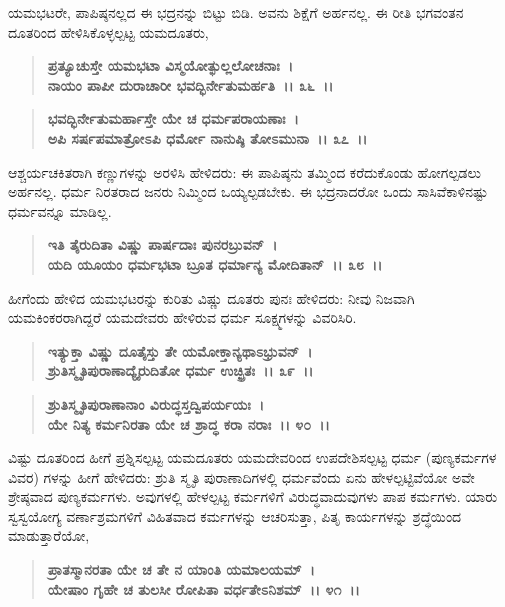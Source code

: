 ಯಮಭಟರೇ, ಪಾಪಿಷ್ಠನಲ್ಲದ ಈ ಭದ್ರನನ್ನು ಬಿಟ್ಟು ಬಿಡಿ. ಅವನು ಶಿಕ್ಷೆಗೆ ಅರ್ಹನಲ್ಲ. ಈ ರೀತಿ ಭಗವಂತನ ದೂತರಿಂದ ಹೇಳಿಸಿಕೊಳ್ಳಲ್ಪಟ್ಟ ಯಮದೂತರು,

\begin{verse}
\textbf{ಪ್ರತ್ಯೂಚುಸ್ತೇ ಯಮಭಟಾ ವಿಸ್ಮಯೋತ್ಫುಲ್ಲಲೋಚನಾಃ~।}\\\textbf{ನಾಯಂ ಪಾಪೀ ದುರಾಚಾರೀ ಭವದ್ಭಿರ್ನೇತುಮರ್ಹತಿ~।। ೩೬~।। }
\end{verse}

\begin{verse}
\textbf{ಭವದ್ಭಿರ್ನೇತುಮರ್ಹಾಸ್ತೇ ಯೇ ಚ ಧರ್ಮಪರಾಯಣಾಃ~।}\\\textbf{ಅಪಿ ಸರ್ಷಪಮಾತ್ರೋಽಪಿ ಧರ್ಮೋ ನಾನುಷ್ಠಿ ತೋಽಮುನಾ~।। ೩೭~।।}
\end{verse}

ಆಶ್ಚರ್ಯಚಕಿತರಾಗಿ ಕಣ್ಣುಗಳನ್ನು ಅರಳಿಸಿ ಹೇಳಿದರು: ಈ ಪಾಪಿಷ್ಠನು ತಮ್ಮಿಂದ ಕರೆದುಕೊಂಡು ಹೋಗಲ್ಪಡಲು ಅರ್ಹನಲ್ಲ. ಧರ್ಮ ನಿರತರಾದ ಜನರು ನಿಮ್ಮಿಂದ ಒಯ್ಯಲ್ಪಡಬೇಕು. ಈ ಭದ್ರನಾದರೋ ಒಂದು ಸಾಸಿವೆಕಾಳಿನಷ್ಟು ಧರ್ಮವನ್ನೂ ಮಾಡಿಲ್ಲ.

\begin{verse}
\textbf{ಇತಿ ತೈರುದಿತಾ ವಿಷ್ಣು ಪಾರ್ಷದಾಃ ಪುನರಬ್ರುವನ್~।}\\\textbf{ಯದಿ ಯೂಯಂ ಧರ್ಮಭಟಾ ಬ್ರೂತ ಧರ್ಮಾನ್ಯ ಮೋದಿತಾನ್~।। ೩೮~।।}
\end{verse}

ಹೀಗೆಂದು ಹೇಳಿದ ಯಮಭಟರನ್ನು ಕುರಿತು ವಿಷ್ಣು ದೂತರು ಪುನಃ ಹೇಳಿದರು: ನೀವು ನಿಜವಾಗಿ ಯಮಕಿಂಕರರಾಗಿದ್ದರೆ ಯಮದೇವರು ಹೇಳಿರುವ ಧರ್ಮ ಸೂಕ್ಷ್ಮಗಳನ್ನು ವಿವರಿಸಿರಿ.

\begin{verse}
\textbf{ಇತ್ಯುಕ್ತಾ ವಿಷ್ಣು ದೂತೈಸ್ತು ತೇ ಯಮೋಕ್ತಾನ್ಯಥಾಽಭ್ರುವನ್~।}\\\textbf{ಶ್ರುತಿಸ್ಮೃತಿಪುರಾಣಾದ್ಯೈರುದಿತೋ ಧರ್ಮ ಉಚ್ಛ್ರಿತಃ~।। ೩೯~।।} 
\end{verse}

\begin{verse}
\textbf{ಶ್ರುತಿಸ್ಮೃತಿಪುರಾಣಾನಾಂ ವಿರುದ್ಧಸ್ತದ್ವಿಪರ್ಯಯಃ~।}\\\textbf{ಯೇ ನಿತ್ಯ ಕರ್ಮನಿರತಾ ಯೇ ಚ ಶ್ರಾದ್ಧ ಕರಾ ನರಾಃ~।। ೪೦~।।}
\end{verse}

ವಿಷ್ಟು ದೂತರಿಂದ ಹೀಗೆ ಪ್ರಶ್ನಿಸಲ್ಪಟ್ಟ ಯಮದೂತರು ಯಮದೇವರಿಂದ ಉಪದೇಶಿಸಲ್ಪಟ್ಟ ಧರ್ಮ (ಪುಣ್ಯಕರ್ಮಗಳ ವಿವರ) ಗಳನ್ನು ಹೀಗೆ ಹೇಳಿದರು: ಶ್ರುತಿ ಸ್ಮೃತಿ ಪುರಾಣಾದಿಗಳಲ್ಲಿ ಧರ್ಮವೆಂದು ಏನು ಹೇಳಲ್ಪಟ್ಟಿವೆಯೋ ಅವೇ ಶ್ರೇಷ್ಠವಾದ ಪುಣ್ಯಕರ್ಮಗಳು. ಅವುಗಳಲ್ಲಿ ಹೇಳಲ್ಪಟ್ಟ ಕರ್ಮಗಳಿಗೆ ವಿರುದ್ಧವಾದುವುಗಳು ಪಾಪ ಕರ್ಮಗಳು. ಯಾರು ಸ್ವಸ್ವಯೋಗ್ಯ ವರ್ಣಾಶ್ರಮಗಳಿಗೆ ವಿಹಿತವಾದ ಕರ್ಮಗಳನ್ನು ಆಚರಿಸುತ್ತಾ, ಪಿತೃ ಕಾರ್ಯಗಳನ್ನು ಶ್ರದ್ಧೆಯಿಂದ ಮಾಡುತ್ತಾರೆಯೋ,

\begin{verse}
\textbf{ಪ್ರಾತಸ್ಮಾನರತಾ ಯೇ ಚ ತೇ ನ ಯಾಂತಿ ಯಮಾಲಯಮ್~।}\\\textbf{ಯೇಷಾಂ ಗೃಹೇ ಚ ತುಲಸೀ ರೋಪಿತಾ ವರ್ಧತೇಽನಿಶಮ್~।। ೪೧~।। }
\end{verse}

